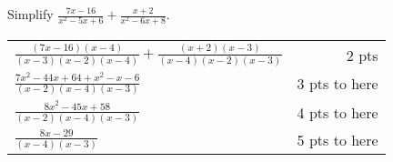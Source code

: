 

{
	Simplify $\displaystyle \frac{7x-16}{x^2-5x+6} + \frac{x+2}{x^2-6x+8}$.
}
{
	\begin{tabular}{l r}
	$\frac{(7x-16)(x-4)}{(x-3)(x-2)(x-4)} + \frac{(x+2)(x-3)}{(x-4)(x-2)(x-3)}$ & 2 pts\\
	$\frac{7x^2-44x+64+x^2-x-6}{(x-2)(x-4)(x-3)}$ & 3 pts to here\\
	$\frac{8x^2-45x+58}{(x-2)(x-4)(x-3)}$ & 4 pts to here\\
	$\frac{8x-29}{(x-4)(x-3)}$ & 5 pts to here
	\end{tabular}
}
